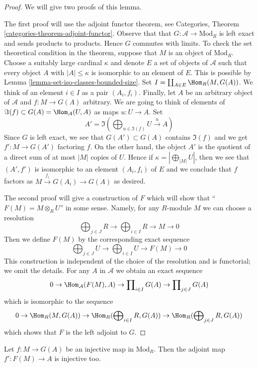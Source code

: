 \begin{proof}
We will give two proofs of this lemma.

\medskip\noindent
The first proof will use the adjoint functor theorem, see
Categories, Theorem \ref{categories-theorem-adjoint-functor}.
Observe that that $G : \mathcal{A} \to \text{Mod}_R$ is left exact and sends
products to products. Hence $G$ commutes with limits. To check the set
theoretical condition in the theorem, suppose that $M$ is an object of
$\text{Mod}_R$. Choose a suitably large cardinal $\kappa$ and denote $E$
a set of objects of $\mathcal{A}$ such that every object $A$ with
$|A| \leq \kappa$ is isomorphic to an element of $E$. This is possible
by Lemma \ref{lemma-set-iso-classes-bounded-size}. Set
$I = \coprod_{A \in E} \Hom_R(M, G(A))$.
We think of an element $i \in I$ as a pair $(A_i, f_i)$.
Finally, let $A$ be an arbitrary object of $\mathcal{A}$
and $f : M \to G(A)$ arbitrary. We are going to think of
elements of $\Im(f) \subset G(A) = \Hom_\mathcal{A}(U, A)$
as maps $u : U \to A$. Set
$$
A' = \Im(\bigoplus\nolimits_{u \in \Im(f)} U \xrightarrow{u} A)
$$
Since $G$ is left exact, we see that $G(A') \subset G(A)$
contains $\Im(f)$ and we get $f' : M \to G(A')$ factoring $f$.
On the other hand, the object $A'$ is
the quotient of a direct sum of at most $|M|$ copies of $U$.
Hence if $\kappa = |\bigoplus_{|M|} U|$, then we see that $(A', f')$
is isomorphic to an element $(A_i, f_i)$ of $E$ and we conclude that $f$
factors as $M \xrightarrow{f_i} G(A_i) \to G(A)$ as desired.

\medskip\noindent
The second proof will give a construction of $F$ which will show
that ``$F(M) = M \otimes_R U$'' in some sense. Namely, for any
$R$-module $M$ we can choose a resolution
$$
\bigoplus\nolimits_{j \in J} R \to
\bigoplus\nolimits_{i \in I} R \to
M \to 0
$$
Then we define $F(M)$ by the corresponding exact sequence
$$
\bigoplus\nolimits_{j \in J} U \to
\bigoplus\nolimits_{i \in I} U \to
F(M) \to 0
$$
This construction is independent of the choice of the resolution
and is functorial; we omit the details.
For any $A$ in $\mathcal{A}$ we obtain an exact sequence
$$
0 \to \Hom_\mathcal{A}(F(M), A) \to
\prod\nolimits_{i \in I} G(A) \to
\prod\nolimits_{j \in J} G(A)
$$
which is isomorphic to the sequence
$$
0 \to \Hom_R(M, G(A)) \to
\Hom_R(\bigoplus\nolimits_{i \in I} R, G(A)) \to
\Hom_R(\bigoplus\nolimits_{j \in J} R, G(A))
$$
which shows that $F$ is the left adjoint to $G$.
\end{proof}

\begin{lemma}
\label{lemma-F-G-monos}
Let $f : M \to G(A)$ be an injective map in $\text{Mod}_R$.
Then the adjoint map $f' : F(M) \to A$ is injective too.
\end{lemma}

